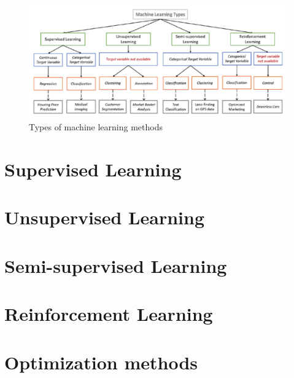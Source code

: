 \begin{figure}[H]
    \begin{center}
        \includegraphics[width=\textwidth]{chapters/3_images/type_of_ml_methods.png}
    \end{center}
    \caption{Types of machine learning methods}
    \label{fig:type_of_ml_methods}
\end{figure}
\chapter{Supervised Learning}

\chapter{Unsupervised Learning}

\chapter{Semi-supervised Learning}

\chapter{Reinforcement Learning}

\chapter{Optimization methods}


